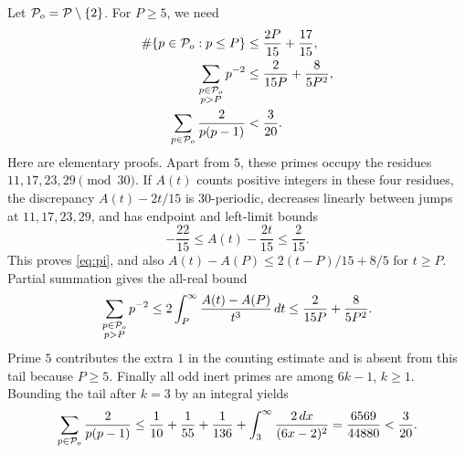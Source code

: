 Let $\mathcal P_o=\mathcal P\setminus\{2\}$. For $P\ge5$, we need
\begin{align}
\#\{p\in\mathcal P_o:p\le P\}&\le\frac{2P}{15}+\frac{17}{15},\label{eq:pi}\\
\sum_{\substack{p\in\mathcal P_o\\p>P}}p^{-2}
&\le\frac{2}{15P}+\frac{8}{5P^2},\label{eq:prime-tail}\\
\sum_{p\in\mathcal P_o}\frac2{p(p-1)}&<\frac3{20}.\label{eq:prime-main}
\end{align}
Here are elementary proofs. Apart from $5$, these primes occupy the
residues $11,17,23,29\pmod{30}$. If $A(t)$ counts positive integers in
these four residues, the discrepancy $A(t)-2t/15$ is $30$-periodic, decreases linearly
between jumps at $11,17,23,29$, and has endpoint and left-limit bounds
\[
-\frac{22}{15}\le A(t)-\frac{2t}{15}\le\frac2{15}.
\]
This proves \eqref{eq:pi}, and also
$A(t)-A(P)\le2(t-P)/15+8/5$ for $t\ge P$. Partial summation gives the all-real bound
\[
\sum_{\substack{p\in\mathcal P_o\\p>P}}p^{-2}
\le2\int_P^\infty\frac{A(t)-A(P)}{t^3}\,dt
\le\frac2{15P}+\frac8{5P^2}.
\]
Prime $5$ contributes the extra $1$ in the counting estimate and is
absent from this tail because $P\ge5$. Finally all odd inert primes are among $6k-1$,
$k\ge1$. Bounding the tail after $k=3$ by an integral yields
\[
\sum_{p\in\mathcal P_o}\frac2{p(p-1)}
\le\frac1{10}+\frac1{55}+\frac1{136}
+\int_3^\infty\frac{2\,dx}{(6x-2)^2}
=\frac{6569}{44880}<\frac3{20}.
\]

